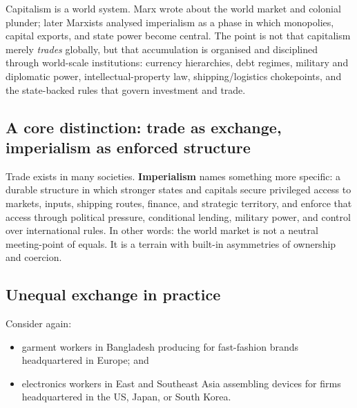 Capitalism is a world system. Marx wrote about the world market and colonial plunder; later Marxists
analysed imperialism as a phase in which monopolies, capital exports, and state power become central.\cite{LeninImperialism,PatnaikImperialism}
The point is not that capitalism merely \emph{trades} globally, but that accumulation is organised and
disciplined through world-scale institutions: currency hierarchies, debt regimes, military and diplomatic
power, intellectual-property law, shipping/logistics chokepoints, and the state-backed rules that govern
investment and trade.

\subsection{A core distinction: trade as exchange, imperialism as enforced structure}
\label{sec:imperialism-trade-structure}

Trade exists in many societies. \textbf{Imperialism} names something more specific: a durable structure in
which stronger states and capitals secure privileged access to markets, inputs, shipping routes, finance,
and strategic territory, and enforce that access through political pressure, conditional lending, military
power, and control over international rules.\cite{LeninImperialism,PatnaikImperialism}
In other words: the world market is not a neutral meeting-point of equals. It is a terrain with built-in
asymmetries of ownership and coercion.


\subsection{Unequal exchange in practice}
\label{sec:unequal-exchange-practice}

Consider again:

\begin{itemize}[leftmargin=1.5em]
  \item garment workers in Bangladesh producing for fast-fashion brands headquartered in Europe; and
  \item electronics workers in East and Southeast Asia assembling devices for firms headquartered in the US, Japan, or South Korea.
\end{itemize}

